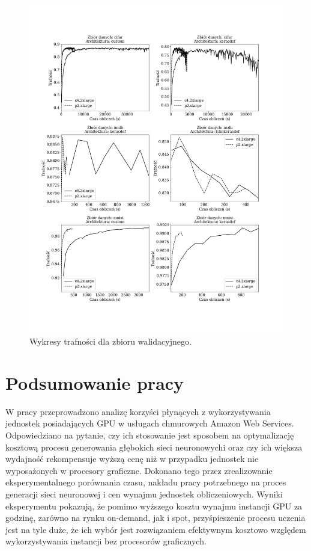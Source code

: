 \documentclass[12pt,a4paper,twoside]{article}
\begin{document}
\begin{figure}[h]
  \centering
\includegraphics[scale=0.5]{../obrazy/fig:experiment_acc_val.png}
\caption{Wykresy trafności dla zbioru walidacyjnego.\label{fig:experiment_acc_val}}
\end{figure}

\clearpage

\section{Podsumowanie pracy}

\noindent
W pracy przeprowadzono analizę korzyści płynących z wykorzystywania jednostek posiadających GPU w usługach chmurowych Amazon Web Services. Odpowiedziano na pytanie, czy ich stosowanie jest sposobem na optymalizację kosztową procesu generowania głębokich sieci neuronowychi oraz czy ich większa wydajność rekompensuje wyższą cenę niż w przypadku jednostek nie wyposażonych w procesory graficzne. Dokonano tego przez zrealizowanie eksperymentalnego porównania czasu, nakładu pracy potrzebnego na proces generacji sieci neuronowej i cen wynajmu jednostek obliczeniowych. Wyniki eksperymentu pokazują, że pomimo wyższego kosztu wynajmu instancji GPU za godzinę, zarówno na rynku on-demand, jak i spot, przyśpieszenie procesu uczenia jest na tyle duże, że ich wybór jest rozwiązaniem efektywnym kosztowo względem wykorzystywania instancji bez procesorów graficznych.
\end{document}
